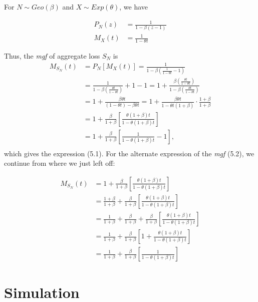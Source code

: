 \documentclass[]{book}
\theoremstyle{definition}
\theoremstyle{definition}
\theoremstyle{definition}
\theoremstyle{remark}
\begin{document}
For \(N\sim Geo(\beta)\) and \(X\sim Exp(\theta)\), we have

\[\begin{aligned}
P_N (z) &=\frac{1}{1- \beta (z-1)}\\
M_{X}(t) &=\frac{1}{1-\theta t}
\end{aligned}\]

Thus, the \emph{mgf} of aggregate loss \(S_N\) is \[\begin{aligned}
M_{S_N}(t) &= P_N [M_{X}(t)] = \frac{1}{1 - \beta \left( \frac{1}{1-\theta t} - 1\right)} \\
&= \frac{1}{1 - \beta \left( \frac{\theta t}{1-\theta t} \right)} + 1 - 1 
= 1+ \frac{\beta \left( \frac{\theta t}{1-\theta t} \right)}{1 - \beta \left( \frac{\theta t}{1-\theta t} \right)} \\
&= 1 + \frac{\beta \theta t}{(1-\theta t) - \beta \theta t} = 1+ \frac{\beta \theta t}{1-\theta t (1+\beta)} \cdot \frac{1+\beta}{1+\beta} \\
&= 1 + \frac{\beta}{1+\beta} \left[ \frac{\theta (1+\beta) t}{1-\theta(1+\beta)t} \right] \\
&= 1 + \frac{\beta}{1+\beta} \left[ \frac{1}{1-\theta(1+\beta)t} - 1 \right], \\
\end{aligned}\] which gives the expression (5.1). For the alternate
expression of the \emph{mgf} (5.2), we continue from where we just left
off:

\[\begin{aligned}
M_{S_N}(t) &=  1 + \frac{\beta}{1+\beta} \left[ \frac{\theta (1+\beta) t}{1-\theta(1+\beta)t} \right] \\
&= \frac{1+\beta}{1+\beta} +  \frac{\beta}{1+\beta} \left[ \frac{\theta (1+\beta) t}{1-\theta(1+\beta)t} \right] \\
&= \frac{1}{1+\beta} + \frac{\beta}{1+\beta} + \frac{\beta}{1+\beta} \left[ \frac{\theta (1+\beta) t}{1-\theta(1+\beta)t} \right]  \\
&= \frac{1}{1+\beta} + \frac{\beta}{1+\beta}\left[1 + \frac{\theta (1+\beta) t}{1-\theta (1+\beta)t} \right] \\
&= \frac{1}{1+\beta} +\frac{\beta}{1+\beta} \left[ \frac{1}{1-\theta (1+\beta)t}\right]
\end{aligned}\]

\chapter{Simulation}\label{C:Simulation}
\end{document}
